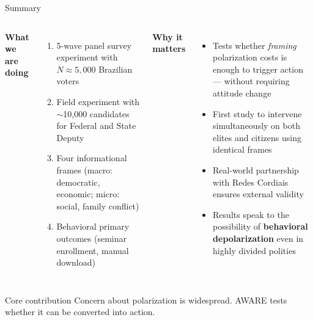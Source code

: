 \documentclass[aspectratio=169]{beamer}
\begin{document}
\begin{frame}{Summary}
  \begin{columns}[T]
      \textbf{What we are doing}
      \begin{enumerate}
        \item 5-wave panel survey experiment with $N \approx 5{,}000$ Brazilian voters
        \item Field experiment with $\sim$10,000 candidates for Federal and State Deputy
        \item Four informational frames (macro: democratic, economic; micro: social, family conflict)
        \item Behavioral primary outcomes (seminar enrollment, manual download)
      \end{enumerate}
      \textbf{Why it matters}
      \begin{itemize}
        \item Tests whether \emph{framing} polarization costs is enough to trigger action — without requiring attitude change
        \item First study to intervene simultaneously on both elites and citizens using identical frames
        \item Real-world partnership with Redes Cordiais ensures external validity
        \item Results speak to the possibility of \textbf{behavioral depolarization} even in highly divided polities
      \end{itemize}
  \end{columns}
  \vspace{0.8em}
  \begin{center}
    \begin{exampleblock}{\centering Core contribution}
      \centering
      Concern about polarization is widespread. AWARE tests whether it can be converted into action.
    \end{exampleblock}
  \end{center}
\end{frame}
\end{document}
